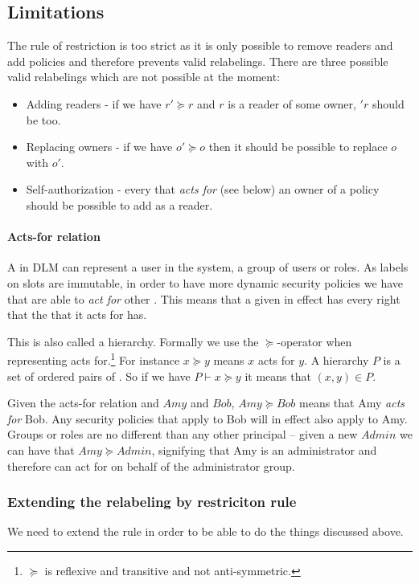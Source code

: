 \subsection{Limitations}
The rule of restriction is too strict as it is only possible to remove readers and add policies  and therefore prevents valid relabelings.
There are three possible valid relabelings which are not possible at the moment:

\begin{itemize}
\item Adding readers - if we have $r' \succeq r$ and $r$ is a reader of some owner, $'r$ should be too.
\item Replacing owners - if we have $o' \succeq o$ then it should be possible to replace $o$ with $o'$.
\item Self-authorization - every \principal{} that \textit{acts for} (see below) an owner of a policy should be possible to add as a reader.
\end{itemize}

\paragraph{Acts-for relation}
A \principal{} in DLM can represent a user in the system, a group of users or roles.
As labels on slots are immutable, in order to have more dynamic security policies we have that \principals{} are able to \textit{act for} other \principals{}.
This means that a given \principal{} in effect has every right that the \principal{} that it acts for has.

This is also called a \principal{} hierarchy.
Formally we use the $\succeq$-operator when representing acts for.\footnote{$\succeq$ is reflexive and transitive and not anti-symmetric.}
For instance $x \succeq y$ means $x$ acts for $y$.
A \principal{} hierarchy $P$ is a set of ordered pairs of \principals{}.
So if we have $P \vdash x \succeq y$ it means that $(x,y) \in P$.

Given the acts-for relation and \principals{} $Amy$ and $Bob$, $Amy \succeq Bob$ means that Amy \textit{acts for} Bob.
Any security policies that apply to Bob will in effect also apply to Amy.
Groups or roles are no different than any other principal -- given a new \principal{} $Admin$ we can have that $Amy \succeq Admin$, signifying that Amy is an administrator and therefore can act for on behalf of the administrator group.

\subsubsection{Extending the relabeling by restriciton rule}
We need to extend the rule in order to be able to do the things discussed above.

